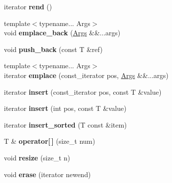 \begin{DoxyCompactItemize}
\item 
iterator {\bfseries rend} ()\hypertarget{classgxx_1_1vector_ab96fe341771f7f91a2b457ef214deea8}{}\label{classgxx_1_1vector_ab96fe341771f7f91a2b457ef214deea8}

\item 
{\footnotesize template$<$typename... Args$>$ }\\void {\bfseries emplace\+\_\+back} (\hyperlink{structArgs}{Args} \&\&...args)\hypertarget{classgxx_1_1vector_a92a8ff8f4c4e9384f7c855b517b22b2b}{}\label{classgxx_1_1vector_a92a8ff8f4c4e9384f7c855b517b22b2b}

\item 
void {\bfseries push\+\_\+back} (const T \&ref)\hypertarget{classgxx_1_1vector_ad2a43751c3e1941eccf7e319b4b6cceb}{}\label{classgxx_1_1vector_ad2a43751c3e1941eccf7e319b4b6cceb}

\item 
{\footnotesize template$<$typename... Args$>$ }\\iterator {\bfseries emplace} (const\+\_\+iterator pos, \hyperlink{structArgs}{Args} \&\&...args)\hypertarget{classgxx_1_1vector_a418d5883df20a9c4745b6004bed69394}{}\label{classgxx_1_1vector_a418d5883df20a9c4745b6004bed69394}

\item 
iterator {\bfseries insert} (const\+\_\+iterator pos, const T \&value)\hypertarget{classgxx_1_1vector_aaaf183732968e596047480014ee55c74}{}\label{classgxx_1_1vector_aaaf183732968e596047480014ee55c74}

\item 
iterator {\bfseries insert} (int pos, const T \&value)\hypertarget{classgxx_1_1vector_af5ea497fd43b5f7ccef916ff714fee7c}{}\label{classgxx_1_1vector_af5ea497fd43b5f7ccef916ff714fee7c}

\item 
iterator {\bfseries insert\+\_\+sorted} (T const \&item)\hypertarget{classgxx_1_1vector_ae3b8fb4d30bfac078881f7298589e792}{}\label{classgxx_1_1vector_ae3b8fb4d30bfac078881f7298589e792}

\item 
T \& {\bfseries operator\mbox{[}$\,$\mbox{]}} (size\+\_\+t num)\hypertarget{classgxx_1_1vector_aa8b2effd5966b917ce84c3baa5dceef0}{}\label{classgxx_1_1vector_aa8b2effd5966b917ce84c3baa5dceef0}

\item 
void {\bfseries resize} (size\+\_\+t n)\hypertarget{classgxx_1_1vector_afa7247fbe395c3dc8762016094c35799}{}\label{classgxx_1_1vector_afa7247fbe395c3dc8762016094c35799}

\item 
void {\bfseries erase} (iterator newend)\hypertarget{classgxx_1_1vector_a5f68ad4efaafe6a1a8e31b4398ddbf2a}{}\label{classgxx_1_1vector_a5f68ad4efaafe6a1a8e31b4398ddbf2a}

\end{DoxyCompactItemize}
